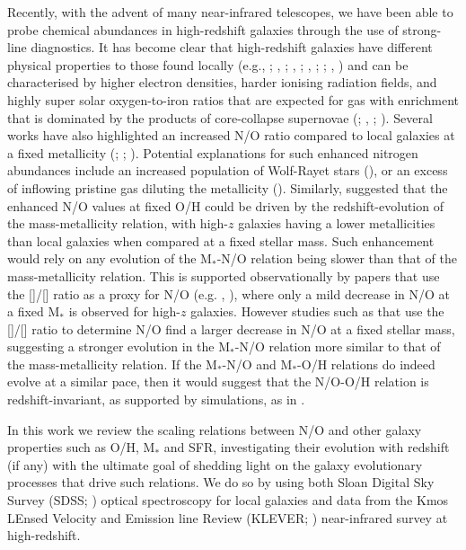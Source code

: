 \documentclass[usenatbib]{mnras} %
\begin{document}
Recently, with the advent of many near-infrared telescopes, we have been able to probe chemical abundances in high-redshift galaxies through the use of strong-line diagnostics. It has become clear that high-redshift galaxies have different physical properties to those found locally (e.g., \citealt{Kewley_2013}; \citealt{Steidel_2014}, \citeyear{Steidel_2016}; \citealt{Shapley_2015}, \citeyear{Shapley_2019}; \citealt{Sanders_2016}, \citeyear{Sanders_2020OH}; \citealt{Kashino_2017}; \citealt{Strom_2017}, \citeyear{Strom_2018}) and can be characterised by higher electron densities, harder ionising radiation fields, and highly super solar oxygen-to-iron ratios that are expected for gas with enrichment that is dominated by the products of core-collapse supernovae (\citealt{Steidel_2016}; \citealt{Topping_2020}, \citeyear{Topping_2020b}; \citealt{Cullen_2021}). Several works have also highlighted an increased N/O ratio compared to local galaxies at a fixed metallicity (\citealt{Masters_2014}; \citealt{Shapley_2015}; \citealt{Strom_2017}). Potential explanations for such enhanced nitrogen abundances include an increased population of Wolf-Rayet stars (\citealt{Masters_2014}), or an excess of inflowing pristine gas diluting the metallicity (\citealt{AndrewsMartini_2013}). Similarly, \cite{Masters_2016} suggested that the enhanced N/O values at fixed O/H could be driven by the redshift-evolution of the mass-metallicity relation, with high-$z$ galaxies having a lower metallicities than local galaxies when compared at a fixed stellar mass. Such enhancement would rely on any evolution of the M$_{*}$-N/O relation being slower than that of the mass-metallicity relation. This is supported observationally by papers that use the []/[] ratio as a proxy for N/O (e.g. \citealt{Perez-Montero_2013}, \citealt{Kashino_2017}), where only a mild decrease in N/O at a fixed M$_{*}$ is observed for high-$z$ galaxies. However studies such as \cite{Strom_2017} that use the []/[] ratio to determine N/O find a larger decrease in N/O at a fixed stellar mass, suggesting a stronger evolution in the M$_{*}$-N/O relation more similar to that of the mass-metallicity relation. If the M$_{*}$-N/O and M$_{*}$-O/H relations do indeed evolve at a similar pace, then it would suggest that the N/O-O/H relation is redshift-invariant, as supported by simulations, as in \cite{V_K_2018}. 

In this work we review the scaling relations between N/O and other galaxy properties such as O/H, M$_{*}$ and SFR, investigating their evolution with redshift (if any) with the ultimate goal of shedding light on the galaxy evolutionary processes that drive such relations. We do so by using both Sloan Digital Sky Survey (SDSS; \citealt{Abazajian_2009}) optical spectroscopy for local galaxies and data from the Kmos LEnsed Velocity and Emission line Review (KLEVER; \citealt{Curti_2020}) near-infrared survey at high-redshift. 
\end{document}
